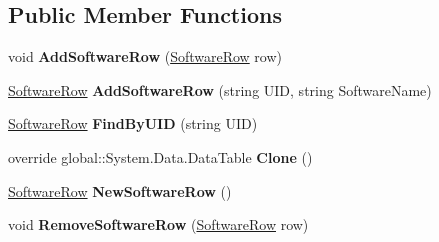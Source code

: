 \subsection*{Public Member Functions}
\begin{DoxyCompactItemize}
\item 
void {\bfseries Add\+Software\+Row} (\hyperlink{class_products_1_1_data_1_1ds_sage_1_1_software_row}{Software\+Row} row)\hypertarget{class_products_1_1_data_1_1ds_sage_1_1_software_data_table_ad846f1b5a144d24826ac37e48f65a3b8}{}\label{class_products_1_1_data_1_1ds_sage_1_1_software_data_table_ad846f1b5a144d24826ac37e48f65a3b8}

\item 
\hyperlink{class_products_1_1_data_1_1ds_sage_1_1_software_row}{Software\+Row} {\bfseries Add\+Software\+Row} (string U\+ID, string Software\+Name)\hypertarget{class_products_1_1_data_1_1ds_sage_1_1_software_data_table_a6f382e5edc715efd920f444d74a49e17}{}\label{class_products_1_1_data_1_1ds_sage_1_1_software_data_table_a6f382e5edc715efd920f444d74a49e17}

\item 
\hyperlink{class_products_1_1_data_1_1ds_sage_1_1_software_row}{Software\+Row} {\bfseries Find\+By\+U\+ID} (string U\+ID)\hypertarget{class_products_1_1_data_1_1ds_sage_1_1_software_data_table_ac28e56b467306bc62c005fa72a33c196}{}\label{class_products_1_1_data_1_1ds_sage_1_1_software_data_table_ac28e56b467306bc62c005fa72a33c196}

\item 
override global\+::\+System.\+Data.\+Data\+Table {\bfseries Clone} ()\hypertarget{class_products_1_1_data_1_1ds_sage_1_1_software_data_table_a98bbb905033f96e82b901f03e4d8c5d3}{}\label{class_products_1_1_data_1_1ds_sage_1_1_software_data_table_a98bbb905033f96e82b901f03e4d8c5d3}

\item 
\hyperlink{class_products_1_1_data_1_1ds_sage_1_1_software_row}{Software\+Row} {\bfseries New\+Software\+Row} ()\hypertarget{class_products_1_1_data_1_1ds_sage_1_1_software_data_table_a0a0b32177f73beb342906c8e111555a1}{}\label{class_products_1_1_data_1_1ds_sage_1_1_software_data_table_a0a0b32177f73beb342906c8e111555a1}

\item 
void {\bfseries Remove\+Software\+Row} (\hyperlink{class_products_1_1_data_1_1ds_sage_1_1_software_row}{Software\+Row} row)\hypertarget{class_products_1_1_data_1_1ds_sage_1_1_software_data_table_a07e97e43ee7abdca84c3d21af5908601}{}\label{class_products_1_1_data_1_1ds_sage_1_1_software_data_table_a07e97e43ee7abdca84c3d21af5908601}

\end{DoxyCompactItemize}
